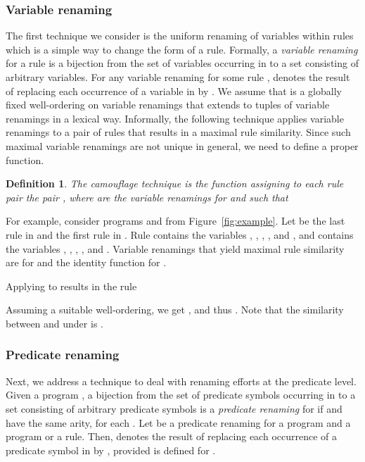 \documentclass{tlp}
\newtheorem{definition}{Definition}
\begin{document}
\subsubsection{Variable renaming}

The first technique we consider is the uniform renaming of variables within rules which
is a  simple way to change the form of a rule. 
Formally, a \emph{variable renaming} for a rule  is a bijection 
from the set  of variables occurring in  to a set  consisting of  arbitrary variables.
For any variable renaming   for some rule ,  denotes the result of 
replacing each occurrence of a variable  in  by . 
We assume that  is a globally fixed well-ordering on variable renamings
that  extends to tuples of variable renamings in a lexical way.
Informally, the following technique applies variable renamings to a pair of rules that results in a maximal 
rule similarity. Since such maximal variable renamings are not unique in general, we need   to define
a proper function.

\begin{definition}\label{def:varrenaming}
The camouflage technique  is the function assigning to
each rule pair  the pair
,
where  are the variable renamings for  and  such that

\end{definition}

For example, consider programs  and  from Figure~\ref{fig:example}.  Let  be the last rule  in   and  the first 
rule in .
Rule  contains the variables , , , , and , and  contains the variables , , , , and . 
Variable renamings  that yield maximal rule similarity are
 for  and the identity function for . 

Applying  to  results in the rule

Assuming a suitable well-ordering, we get , and thus
.
Note that the similarity between  and  under  is  . 

\subsubsection{Predicate renaming}
Next, we address a technique to deal with renaming efforts at the predicate level. 
Given a program ,  a bijection  from the set  of predicate symbols occurring  in   to  a set 
consisting of  arbitrary predicate symbols is a \emph{predicate renaming} for  if
 and  have the same arity, 
for each .
Let  be a predicate renaming for a program and 
a program or a rule. Then,  denotes the result of 
replacing each occurrence of a predicate symbol  in  by , provided  is defined for .  
\end{document}
